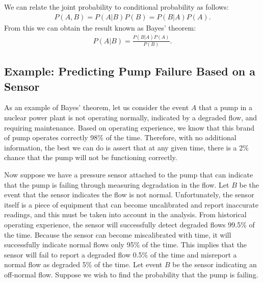 We can relate the joint probability to conditional probability as follows:
\begin{align}
  P(A,B) = P(A|B)P(B) = P(B|A)P(A).
\end{align}
From this we can obtain the result known as Bayes' theorem:
\begin{align}
  P(A|B) = \frac{ P(B|A) P(A) }{ P(B) } .
\end{align}

\subsection{Example: Predicting Pump Failure Based on a Sensor}

As an example of Bayes' theorem, let us consider the event $A$ that a pump in a nuclear power plant is not operating normally, indicated by a degraded flow, and requiring maintenance. Based on operating experience, we know that this brand of pump operates correctly 98\% of the time. Therefore, with no additional information, the best we can do is assert that at any given time, there is a 2\% chance that the pump will not be functioning correctly.

Now suppose we have a pressure sensor attached to the pump that can indicate that the pump is failing through measuring degradation in the flow. Let $B$ be the event that the sensor indicates the flow is not normal. Unfortunately, the sensor itself is a piece of equipment that can become uncalibrated and report inaccurate readings, and this must be taken into account in the analysis. From historical operating experience, the sensor will successfully detect degraded flows 99.5\% of the time. Because the sensor can become miscalibrated with time, it will successfully indicate normal flows only 95\% of the time. This implies that the sensor will fail to report a degraded flow 0.5\% of the time and misreport a normal flow as degraded 5\% of the time. Let event $B$ be the sensor indicating an off-normal flow. Suppose we wish to find the probability that the pump is failing.

